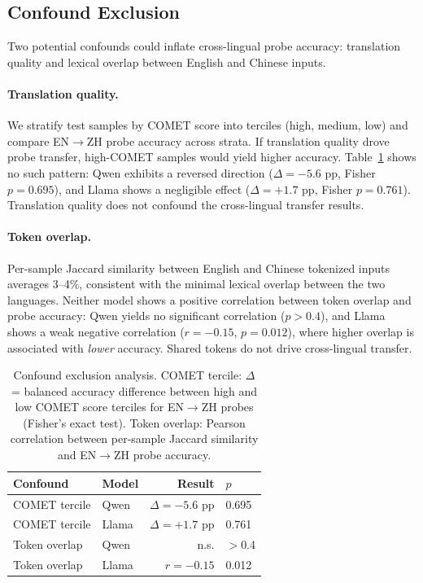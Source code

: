 \subsection{Confound Exclusion}
\label{sec:confounds}

Two potential confounds could inflate cross-lingual probe accuracy: translation quality and lexical overlap between English and Chinese inputs.

\paragraph{Translation quality.}
We stratify test samples by COMET score into terciles (high, medium, low) and compare EN$\to$ZH probe accuracy across strata.
If translation quality drove probe transfer, high-COMET samples would yield higher accuracy.
Table~\ref{tab:confound} shows no such pattern: Qwen exhibits a reversed direction ($\Delta = -5.6$ pp, Fisher $p = 0.695$), and Llama shows a negligible effect ($\Delta = +1.7$ pp, Fisher $p = 0.761$).
Translation quality does not confound the cross-lingual transfer results.

\paragraph{Token overlap.}
Per-sample Jaccard similarity between English and Chinese tokenized inputs averages 3--4\%, consistent with the minimal lexical overlap between the two languages.
Neither model shows a positive correlation between token overlap and probe accuracy: Qwen yields no significant correlation ($p > 0.4$), and Llama shows a weak negative correlation ($r = -0.15$, $p = 0.012$), where higher overlap is associated with \emph{lower} accuracy.
Shared tokens do not drive cross-lingual transfer.

\begin{table}[t]
\centering
\caption{Confound exclusion analysis. COMET tercile: $\Delta$ = balanced accuracy difference between high and low COMET score terciles for EN$\to$ZH probes (Fisher's exact test). Token overlap: Pearson correlation between per-sample Jaccard similarity and EN$\to$ZH probe accuracy.}
\label{tab:confound}
\begin{tabular}{llrl}
\toprule
Confound & Model & Result & $p$ \\
\midrule
COMET tercile & Qwen & $\Delta = -5.6$ pp & 0.695 \\
COMET tercile & Llama & $\Delta = +1.7$ pp & 0.761 \\
\midrule
Token overlap & Qwen & n.s. & $>$0.4 \\
Token overlap & Llama & $r = -0.15$ & 0.012 \\
\bottomrule
\end{tabular}
\end{table}

